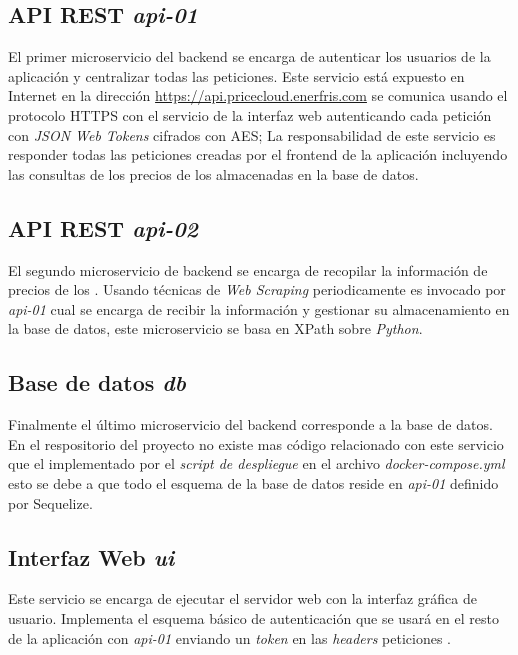 \subsection{\acrshort{API REST} \emph{api-01}}
El primer microservicio del backend se encarga de autenticar los usuarios de la aplicación y centralizar todas las peticiones. Este servicio está expuesto en Internet en la dirección \url{https://api.pricecloud.enerfris.com} se comunica usando el protocolo \acrfull{HTTPS} con el servicio de la interfaz web autenticando cada petición con \emph{JSON Web Tokens} cifrados con \acrfull{AES}; La responsabilidad de este servicio es responder todas las peticiones creadas por el frontend de la aplicación incluyendo las consultas de los precios de los  almacenadas en la base de datos.

\subsection{\acrshort{API REST} \emph{api-02}}
El segundo microservicio de backend se encarga de recopilar la información de precios de los . Usando técnicas de \emph{Web Scraping} periodicamente es invocado por \emph{api-01} cual se encarga de recibir la información y gestionar su almacenamiento en la base de datos, este microservicio se basa en \gls{XPath} sobre \emph{Python}.

\subsection{Base de datos \emph{db}}
Finalmente el último microservicio del backend corresponde a la base de datos. En el respositorio del proyecto no existe mas código relacionado con este servicio que el implementado por el \emph{script de despliegue} en el archivo \emph{docker-compose.yml} esto se debe a que todo el esquema de la base de datos reside en \emph{api-01} definido por \gls{Sequelize}.

\subsection{Interfaz Web \emph{ui}}
Este servicio se encarga de ejecutar el servidor web con la interfaz gráfica de usuario. Implementa el esquema básico de autenticación que se usará en el resto de la aplicación con \emph{api-01} enviando un \emph{token} en las \emph{headers} peticiones .
